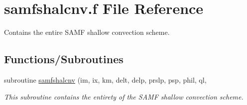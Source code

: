 \hypertarget{samfshalcnv_8f}{}\section{samfshalcnv.\+f File Reference}
\label{samfshalcnv_8f}


Contains the entire S\+A\+MF shallow convection scheme.  


\subsection*{Functions/\+Subroutines}
\textbf{ }\par
\begin{DoxyCompactItemize}
\item 
subroutine \hyperlink{group___s_a_m_f__shal_ga8dbd74881cc19752c56c4fc49512e44c}{samfshalcnv} (im, ix, km, delt, delp, prslp, psp, phil, ql,
\begin{DoxyCompactList}\small\item\em This subroutine contains the entirety of the S\+A\+MF shallow convection scheme. \end{DoxyCompactList}\end{DoxyCompactItemize}

